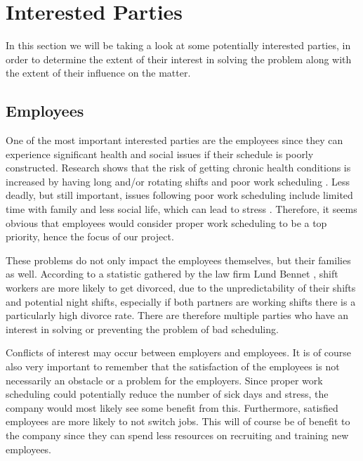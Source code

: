 \section{Interested Parties}
In this section we will be taking a look at some potentially interested parties, in order to determine the extent of their interest in solving the problem along with the extent of their influence on the matter.

\subsection{Employees}

One of the most important interested parties are the employees since they can experience significant health and social issues if their schedule is poorly constructed. Research shows that the risk of getting chronic health conditions is increased by having long and/or rotating shifts and poor work scheduling \parencite{mchugh_qualitative_2020}. Less deadly, but still important, issues following poor work scheduling include limited time with family and less social life, which can lead to stress \parencite{stephanie_willett_7_2019}. Therefore, it seems obvious that employees would consider proper work scheduling to be a top priority, hence the focus of our project.

These problems do not only impact the employees themselves, but their families as well. According to a statistic gathered by the law firm Lund Bennet \parencite{lund_bennet_rise_2017-1}, shift workers are more likely to get divorced, due to the unpredictability of their shifts and potential night shifts, especially if both partners are working shifts there is a particularly high divorce rate. There are therefore multiple parties who have an interest in solving or preventing the problem of bad scheduling.

Conflicts of interest may occur between employers and employees. It is of course also very important to remember that the satisfaction of the employees is not necessarily an obstacle or a problem for the employers. Since proper work scheduling could potentially reduce the number of sick days and stress, the company would most likely see some benefit from this. Furthermore, satisfied employees are more likely to not switch jobs. This will of course be of benefit to the company since they can spend less resources on recruiting and training new employees. \parencite{daniel_sgroi_happiness_nodate}

